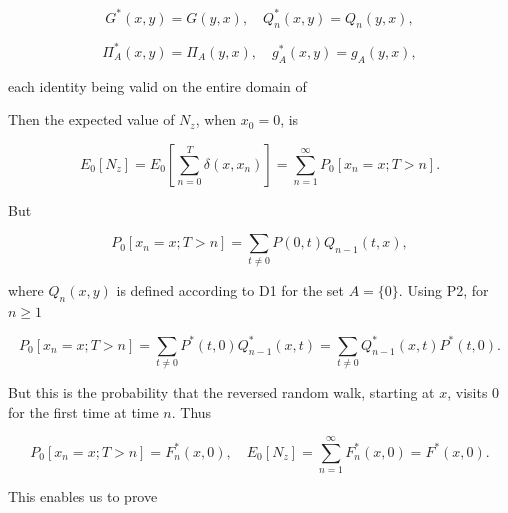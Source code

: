$$G^*(x,y) = G(y,x), \quad Q_n^*(x,y) = Q_n(y,x),$$

$$\Pi_A^*(x,y) = \Pi_A(y,x), \quad g_A^*(x,y) = g_A(y,x),$$

each identity being valid on the entire domain of

Then the expected value of $N_z$, when $x_0 = 0$, is

$$E_0[N_z] = E_0[\sum_{n=0}^{T} \delta(x,x_n)] = \sum_{n=1}^{\infty} P_0[x_n = x; T > n].$$

But

$$P_0[x_n = x; T > n] = \sum_{t \neq 0} P(0,t)Q_{n-1}(t,x),$$

where $Q_n(x,y)$ is defined according to D1 for the set $A = \{0\}$. Using P2, for $n \geq 1$

$$P_0[x_n = x; T > n] = \sum_{t \neq 0} P^*(t,0)Q_{n-1}^*(x,t) = \sum_{t \neq 0} Q_{n-1}^*(x,t)P^*(t,0).$$

But this is the probability that the reversed random walk, starting at $x$, visits 0 for the first time at time $n$. Thus

$$P_0[x_n = x; T > n] = F_n^*(x,0), \quad E_0[N_z] = \sum_{n=1}^{\infty} F_n^*(x,0) = F^*(x,0).$$

This enables us to prove